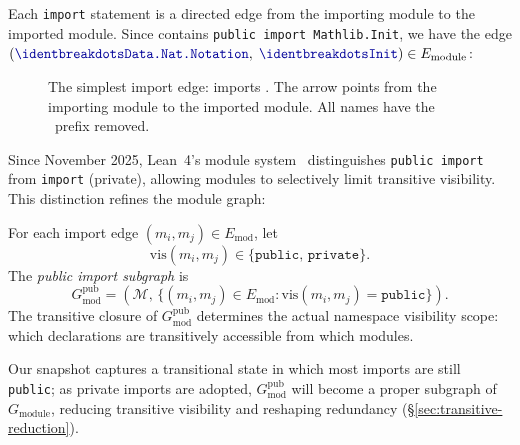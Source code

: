 \noindent
Each \texttt{import} statement is a directed edge from the importing module to the imported module.
Since  contains \texttt{public import Mathlib.Init}, we have the edge $(\module{Data.Nat.Notation},\; \module{Init}) \in E_{\mathrm{module}}$:

\begin{figure}[H]
\centering
{}
\caption{The simplest import edge:  imports . The arrow points from the importing module to the imported module. All names have the \ prefix removed.}
\label{fig:single-import-edge}
\end{figure}

Since November 2025, Lean~4's module system~\cite{lean4modules} distinguishes \texttt{public import} from \texttt{import} (private), allowing modules to selectively limit transitive visibility. This distinction refines the module graph:

\begin{definition}\label{def:visibility-graph}
For each import edge $(m_i, m_j) \in E_{\mathrm{mod}}$, let
\[
  \mathrm{vis}(m_i, m_j) \in \{\texttt{public},\, \texttt{private}\}.
\]
The \emph{public import subgraph} is
\[
  G_{\mathrm{mod}}^{\mathrm{pub}} = (\mathcal{M},\, \{(m_i, m_j) \in E_{\mathrm{mod}} : \mathrm{vis}(m_i, m_j) = \texttt{public}\}).
\]
The transitive closure of $G_{\mathrm{mod}}^{\mathrm{pub}}$ determines the actual namespace visibility scope: which declarations are transitively accessible from which modules.
\end{definition}

\noindent Our snapshot captures a transitional state in which most imports are still \texttt{public}; as private imports are adopted, $G_{\mathrm{mod}}^{\mathrm{pub}}$ will become a proper subgraph of $G_{\mathrm{module}}$, reducing transitive visibility and reshaping redundancy (\S\ref{sec:transitive-reduction}).

